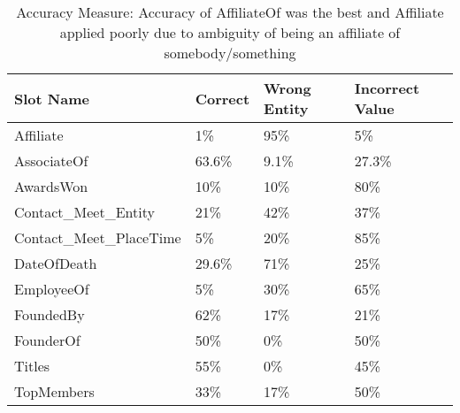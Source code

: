 \begin{table}
\caption{Accuracy Measure: Accuracy of AffiliateOf was the best and Affiliate applied poorly due to ambiguity of being an affiliate of somebody/something}
\centering
\label{table:finalresultaccuracy}
\begin{tabular}{|l|p{10mm}|p{10mm}|p{11mm}|}
\hline 
 \textbf{Slot Name}  & \textbf{Correct} & \textbf{Wrong Entity} & {\small \textbf{Incorrect Value}} \\ 
\hline 
Affiliate & 1\% & 95\% & 5\% \\ \hline 
AssociateOf & 63.6\% & 9.1\% & 27.3\%  \\ \hline 
AwardsWon & 10\% & 10\% & 80\%  \\ \hline 
Contact\_Meet\_Entity & 21\% & 42\% & 37\%  \\ \hline 
Contact\_Meet\_PlaceTime & 5\% & 20\% & 85\%  \\ \hline 
DateOfDeath & 29.6\% & 71\% & 25\%  \\ \hline 
EmployeeOf & 5\% & 30\% & 65\%  \\ \hline 
FoundedBy & 62\% & 17\% & 21\%  \\ \hline 
FounderOf & 50\% & 0\% & 50\%  \\ \hline 
Titles & 55\% & 0\% & 45\%  \\ \hline 
TopMembers & 33\% & 17\% & 50\%  \\ \hline 

\end{tabular} 
\end{table}









